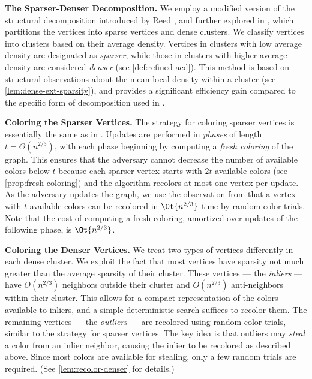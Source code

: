\documentclass[a4paper,english,11pt]{amsart}
\renewcommand{\paragraph}[1]{\medskip\noindent\textbf{#1}}
\theoremstyle{definition}
\begin{document}
\paragraph{The Sparser-Denser Decomposition.}
We employ a modified version of the structural decomposition introduced by Reed \cite{Reed98}, and further explored in \cite{HSS18, ACK19}, which partitions the vertices into sparse vertices and dense clusters. We classify vertices into clusters based on their average density. Vertices in clusters with low average density are designated as \emph{sparser}, while those in clusters with higher average density are considered \emph{denser} (see \cref{def:refined-acd}). This method is based on structural observations about the mean local density within a cluster (see \cref{lem:dense-ext-sparsity}), and provides a significant efficiency gain compared to the specific form of decomposition used in \cite{BRW24}.

\paragraph{Coloring the Sparser Vertices.}
The strategy for coloring sparser vertices is essentially the same as in \cite{BRW24}. Updates are performed in \emph{phases} of length $t = \Theta(n^{2/3})$, with each phase beginning by computing a \emph{fresh coloring} of the graph. This ensures that the adversary cannot decrease the number of available colors below $t$ because each sparser vertex starts with $2t$ available colors (see \cref{prop:fresh-coloring}) and the algorithm recolors at most one vertex per update. As the adversary updates the graph, we use the observation from \cite{ACK19,BRW24} that a vertex with $t$ available colors can be recolored in $\Ot{ n^{2/3} }$ time by random color trials. Note that the cost of computing a fresh coloring, amortized over updates of the following phase, is $\Ot{ n^{2/3} }$.


\paragraph{Coloring the Denser Vertices.}
We treat two types of vertices differently in each dense cluster. We exploit the fact that most vertices have sparsity not much greater than the average sparsity of their cluster. These vertices --- the \emph{inliers} --- have $O(n^{2/3})$ neighbors outside their cluster and $O(n^{2/3})$ anti-neighbors within their cluster. This allows for a compact representation of the colors available to inliers, and a simple deterministic search suffices to recolor them. The remaining vertices --- the \emph{outliers} --- are recolored using random color trials, similar to the strategy for sparser vertices. The key idea is that outliers may \emph{steal} a color from an inlier neighbor, causing the inlier to be recolored as described above. Since most colors are available for stealing, only a few random trials are required. (See \cref{lem:recolor-denser} for details.)
\end{document}
